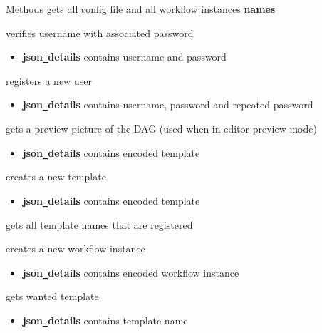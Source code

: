 \begin{methodenv}{Methods}
gets all  config file and all workflow instances \textbf{names} 

verifies username with associated password
\begin{itemize}
        \item \textbf{json\texttt{\_}details}
        contains username and password
\end{itemize}

registers a new user
\begin{itemize}
        \item \textbf{json\texttt{\_}details}
        contains username, password and repeated password
\end{itemize}

gets a preview picture of the DAG (used when in editor preview mode)
\begin{itemize}
        \item \textbf{json\texttt{\_}details}
        contains encoded template
\end{itemize}

creates a new template
\begin{itemize}
        \item \textbf{json\texttt{\_}details}
        contains encoded template
\end{itemize}

gets all template names that are registered

creates a new workflow instance
\begin{itemize}
        \item \textbf{json\texttt{\_}details}
        contains encoded workflow instance
\end{itemize}

gets wanted template
\begin{itemize}
        \item \textbf{json\texttt{\_}details}
        contains template name
\end{itemize}



\end{methodenv}

